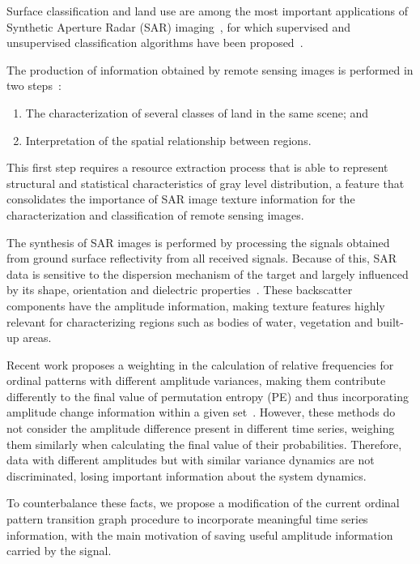 \documentclass{isprs}
\begin{document}
	Surface classification and land use are among the most important applications of Synthetic Aperture Radar (SAR) imaging~\citep{Pottier2004Unsupervised}, for which supervised and unsupervised classification algorithms have been proposed~\citep{Bhattacharya2018Unsupervised,Chen1996multifrequency,ZYL1992Bayesian}.
	
	The production of information obtained by remote sensing images is performed in two steps~\citep{rajesh2001performance}:
	
	\begin{enumerate}
		\item The characterization of several classes of land in the same scene; and
		\item Interpretation of the spatial relationship between regions.
	\end{enumerate}
	
	This first step requires a resource extraction process that is able to represent structural and statistical characteristics of gray level distribution, a feature that consolidates the importance of SAR image texture information for the characterization and classification of remote sensing images.
	
	The synthesis of SAR images is performed by processing the signals obtained from ground surface reflectivity from all received signals.
	Because of this, SAR data is sensitive to the dispersion mechanism of the target and largely influenced by its shape, orientation and dielectric properties~\citep{Moriyama2004study, Fujita2004Polarimetric}.
	These backscatter components have the amplitude information, making texture features highly relevant for characterizing regions such as bodies of water, vegetation and built-up areas.
	
	Recent work proposes a weighting in the calculation of relative frequencies for ordinal patterns with different amplitude variances, making them contribute differently to the final value of permutation entropy (PE) and thus incorporating amplitude change information within a given set~\citep{Fadlallah2013Weightedpermutation}.
	However, these methods do not consider the amplitude difference present in different time series, weighing them similarly when calculating the final value of their probabilities.
	Therefore, data with different amplitudes but with similar variance dynamics are not discriminated, losing important information about the system dynamics.
	
	To counterbalance these facts, we propose a modification of the current ordinal pattern transition graph procedure to incorporate meaningful time series information, with the main motivation of saving useful amplitude information carried by the signal.
	
\end{document}
